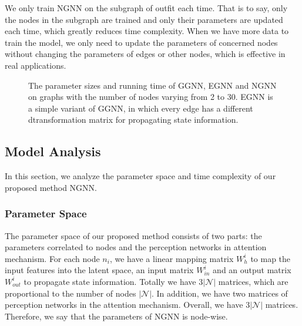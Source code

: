 \documentclass[sigconf]{acmart}
\begin{document}
We only train NGNN on the subgraph of outfit each time. That is to say, only the nodes in the subgraph are trained and only their parameters are updated each time, which greatly reduces time complexity.
When we have more data to train the model, we only need to update the parameters of concerned nodes without changing the parameters of edges or other nodes, which is effective in real applications.


\begin{figure}[htbp]
\centering

\caption{The parameter sizes and running time of GGNN, EGNN and NGNN on graphs with the number of nodes varying from 2 to 30. EGNN is a simple variant of GGNN, in which every edge has a different dtransformation matrix for propagating state information. }
\label{fig:complexity}
\end{figure}

\subsection{Model Analysis}

In this section, we analyze the parameter space and time complexity of our proposed method NGNN.

\subsubsection{Parameter Space}\label{sect:parameter}
The parameter space of our proposed method consists of two parts: the parameters correlated to nodes and the perception networks in attention mechanism.
For each node $n_{i}$, we have a linear mapping matrix $W_{h}^{i}$ to map the input features into the latent space, an input matrix $W_{in}^{i}$ and an output matrix $W_{out}^{i}$ to propagate state information. Totally we have $3\left | \mathcal{N}  \right |$ matrices, which are proportional to the number of nodes $\left | \mathcal{N}  \right |$. In addition, we have two matrices of perception networks in the attention mechanism. Overall, we have $3\left | \mathcal{N}  \right |$ matrices. Therefore, we say that the parameters of NGNN is node-wise. 
\end{document}
